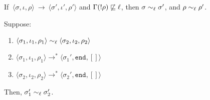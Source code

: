 \begin{myLemma}
\label{lem:exc:conf}
If $~\langle \sigma, \iota, \rho \rangle~\rightarrow~\langle \sigma',
\iota', \rho' \rangle$ and $\Gamma(!\rho) \not\sqsubseteq \ell$, then
$\sigma \sim_\ell \sigma'$, and $\rho \sim_\ell \rho'$.
\end{myLemma}

\begin{myThm}
\label{thm:exc:ni}
Suppose:
\begin{enumerate}
\item $\langle \sigma_1, \iota_1, \rho_1 \rangle \sim_\ell
\langle \sigma_2, \iota_2, \rho_2\rangle$
\item $\langle \sigma_1, \iota_1, \rho_1 \rangle
  \rightarrow^{*} \langle \sigma_1', \texttt{end}, [] \rangle$
\item $\langle \sigma_2, \iota_2, \rho_2 \rangle \rightarrow^{*}
  \langle \sigma_2', \texttt{end}, []\rangle$
\end{enumerate}
Then, $\sigma_1' \sim_\ell \sigma_2'$.
\end{myThm}
